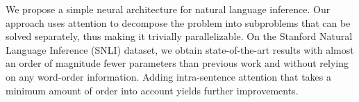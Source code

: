 We propose a simple neural architecture for natural language inference. Our approach uses attention to decompose the problem into subproblems that can be solved separately, thus making it trivially parallelizable. On the Stanford Natural Language Inference (SNLI) dataset, we obtain state-of-the-art results with almost an order of magnitude fewer parameters than previous work and without relying on any word-order information. Adding intra-sentence attention that takes a minimum amount of order into account yields further improvements.
